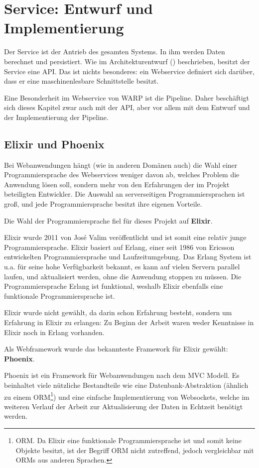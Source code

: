 \section{Service: Entwurf und Implementierung}
\label{sec:service}

Der Service ist der Antrieb des gesamten Systems. In ihm werden Daten berechnet und persistiert. Wie im Architekturentwurf () beschrieben, besitzt der Service eine \ac{API}. Das ist nichts besonderes: ein Webservice definiert sich darüber, dass er eine maschinenlesbare Schnittstelle besitzt.

Eine Besonderheit im Webservice von WARP ist die Pipeline. Daher beschäftigt sich dieses Kapitel zwar auch mit der \ac{API}, aber vor allem mit dem Entwurf und der Implementierung der Pipeline.

\subsection{Elixir und Phoenix}

Bei Webanwendungen hängt (wie in anderen Domänen auch) die Wahl einer Programmiersprache des Webservices weniger davon ab, welches Problem die Anwendung lösen soll, sondern mehr von den Erfahrungen der im Projekt beteiligten Entwickler. Die Auswahl an serverseitigen Programmiersprachen ist groß, und jede Programmiersprache besitzt ihre eigenen Vorteile.

Die Wahl der Programmiersprache fiel für dieses Projekt auf \textbf{Elixir}.

Elixir wurde 2011 von José Valim veröffentlicht und ist somit eine relativ junge Programmiersprache. Elixir basiert auf Erlang, einer seit 1986 von Ericsson entwickelten Programmiersprache und Laufzeitumgebung. Das Erlang System ist u.a. für seine hohe Verfügbarkeit bekannt, es kann auf vielen Servern parallel laufen, und aktualisiert werden, ohne die Anwendung stoppen zu müssen. Die Programmiersprache Erlang ist funktional, weshalb Elixir ebenfalls eine funktionale Programmiersprache ist. \citep{wiki:elixir}

Elixir wurde nicht gewählt, da darin schon Erfahrung besteht, sondern um Erfahrung in Elixir zu erlangen: Zu Beginn der Arbeit waren weder Kenntnisse in Elixir noch in Erlang vorhanden.

Als Webframework wurde das bekannteste Framework für Elixir gewählt: \textbf{Phoenix}.

Phoenix ist ein Framework für Webanwendungen nach dem \ac{MVC} Modell. Es beinhaltet viele nützliche Bestandteile wie eine Datenbank-Abstraktion (ähnlich zu einem \acs{ORM}\footnote{\acf{ORM}. Da Elixir eine funktionale Programmiersprache ist und somit keine Objekte besitzt, ist der Begriff \acs{ORM} nicht zutreffend, jedoch vergleichbar mit ORMs aus anderen Sprachen.}) und eine einfache Implementierung von Websockets, welche im weiteren Verlauf der Arbeit zur Aktualisierung der Daten in Echtzeit benötigt werden.

